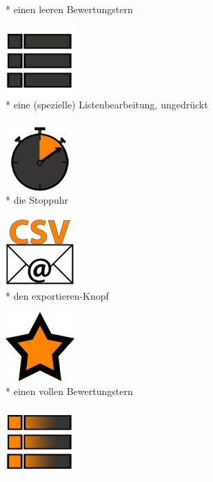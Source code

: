 \documentclass[FIPLY_base.tex]{subfiles}
\begin{document}
\begin{figure}[H]
\begin{subfigure}[b]{0.2\textwidth}
			\caption{* einen leeren Bewertungstern}
		\end{subfigure}
		\hfil
		\begin{subfigure}[b]{0.2\textwidth}
			\includegraphics[scale=0.5]{img/icons/listviewunpressed}
			\caption{* eine (spezielle) Listenbearbeitung, ungedrückt}
		\end{subfigure}
		\hfil
		\begin{subfigure}[b]{0.2\textwidth}
			\includegraphics[scale=0.5]{img/icons/stopwatch}
			\caption{* die Stoppuhr}
		\end{subfigure}
		\hfil
		\begin{subfigure}[b]{0.2\textwidth}
			\includegraphics[scale=0.5]{img/icons/exportcsvsmall}
			\caption{* den exportieren-Knopf}
		\end{subfigure}
		\hfil
		\begin{subfigure}[b]{0.2\textwidth}
			\includegraphics[scale=0.5]{img/icons/starsmall}
			\caption{* einen vollen Bewertungstern}
		\end{subfigure}
		\hfil
		\begin{subfigure}[b]{0.2\textwidth}
			\includegraphics[scale=0.5]{img/icons/listviewpressed}

\end{subfigure}
\end{figure}
\end{document}
